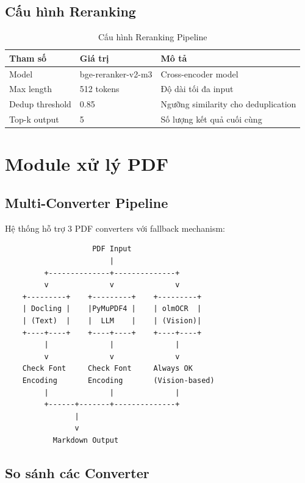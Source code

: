 \documentclass[../DoAn.tex]{subfiles}
\begin{document}
\subsection{Cấu hình Reranking}
\begin{table}[h]
\centering
\begin{tabular}{|l|l|l|}
\hline
\textbf{Tham số} & \textbf{Giá trị} & \textbf{Mô tả} \\
\hline
Model & bge-reranker-v2-m3 & Cross-encoder model \\
\hline
Max length & 512 tokens & Độ dài tối đa input \\
\hline
Dedup threshold & 0.85 & Ngưỡng similarity cho deduplication \\
\hline
Top-k output & 5 & Số lượng kết quả cuối cùng \\
\hline
\end{tabular}
\caption{Cấu hình Reranking Pipeline}
\end{table}

\section{Module xử lý PDF}

\subsection{Multi-Converter Pipeline}
Hệ thống hỗ trợ 3 PDF converters với fallback mechanism:

\begin{verbatim}
                    PDF Input
                        |
         +--------------+--------------+
         v              v              v
    +---------+    +---------+    +---------+
    | Docling |    |PyMuPDF4 |    | olmOCR  |
    | (Text)  |    |  LLM    |    | (Vision)|
    +----+----+    +----+----+    +----+----+
         |              |              |
         v              v              v
    Check Font     Check Font     Always OK
    Encoding       Encoding       (Vision-based)
         |              |              |
         +------+-------+--------------+
                |
                v
           Markdown Output
\end{verbatim}

\subsection{So sánh các Converter}
\end{document}
